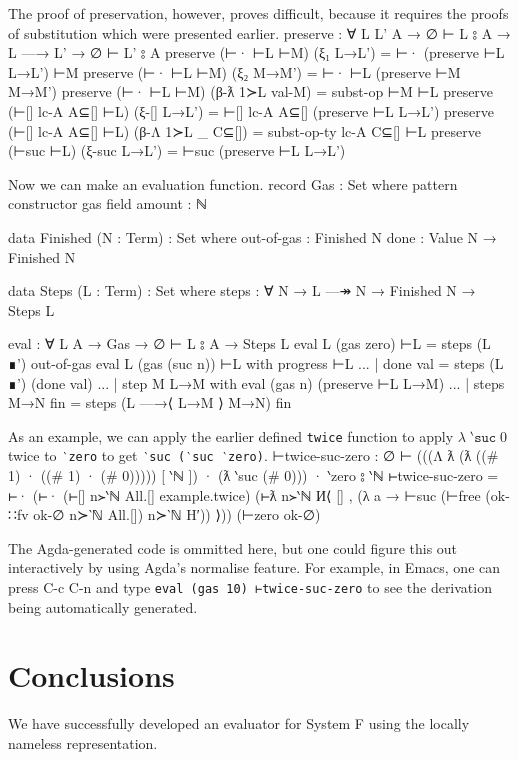 \documentclass[logo,bsc,singlespacing,parskip,online]{infthesis}
\renewenvironment{code}{\mintedcopy[breaklines,breaksymbolleft=\;]{agda}}{\endmintedcopy}
\begin{document}
The proof of preservation, however, proves difficult, because it requires the proofs of substitution
which were presented earlier.
\begin{code}
  preserve : ∀ {L L' A} → ∅ ⊢ L ⦂ A → L —→ L' → ∅ ⊢ L' ⦂ A
  preserve (⊢· ⊢L ⊢M) (ξ₁ L→L') = ⊢· (preserve ⊢L L→L') ⊢M
  preserve (⊢· ⊢L ⊢M) (ξ₂ M→M') = ⊢· ⊢L (preserve ⊢M M→M')
  preserve (⊢· ⊢L ⊢M) (β-ƛ 1≻L val-M) = subst-op ⊢M ⊢L
  preserve (⊢[] lc-A A⊆[] ⊢L) (ξ-[] L→L') =
    ⊢[] lc-A A⊆[] (preserve ⊢L L→L')
  preserve (⊢[] lc-A A⊆[] ⊢L) (β-Λ 1≻L _ C⊆[]) =
    subst-op-ty lc-A C⊆[] ⊢L
  preserve (⊢suc ⊢L) (ξ-suc L→L') = ⊢suc (preserve ⊢L L→L')
\end{code}

Now we can make an evaluation function.
\begin{code}
  record Gas : Set where
    pattern
    constructor gas
    field
      amount : ℕ

  data Finished (N : Term) : Set where
    out-of-gas : Finished N
    done : Value N → Finished N

  data Steps (L : Term) : Set where
    steps : ∀ {N} → L —↠ N → Finished N → Steps L

  eval : ∀ {L A} → Gas → ∅ ⊢ L ⦂ A → Steps L
  eval {L} (gas zero) ⊢L = steps (L ∎') out-of-gas
  eval {L} (gas (suc n)) ⊢L with progress ⊢L
  ... | done val = steps (L ∎') (done val)
  ... | step {M} L→M with eval (gas n) (preserve ⊢L L→M)
  ...   | steps M→N fin = steps (L —→⟨ L→M ⟩ M→N) fin
\end{code}

As an example, we can apply the earlier defined \texttt{twice} function to apply $\lambda \;
\texttt{‵suc} \; 0$ twice to \texttt{‵zero} to get \texttt{‵suc (‵suc ‵zero)}.
\begin{code}
  ⊢twice-suc-zero :
    ∅ ⊢ (((Λ ƛ (ƛ ((# 1) · ((# 1) · (# 0))))) [ ‵ℕ ])
          · (ƛ ‵suc (# 0))) · ‵zero
        ⦂ ‵ℕ
  ⊢twice-suc-zero = ⊢·
    (⊢· (⊢[] n≻‵ℕ All.[] example.twice)
      (⊢ƛ n≻‵ℕ И⟨ [] , (λ a →
        ⊢suc (⊢free (ok-∷fv ok-∅ n≻‵ℕ All.[]) n≻‵ℕ H′)) ⟩))
    (⊢zero ok-∅)
\end{code}

The Agda-generated code is ommitted here, but one could figure this out interactively by using
Agda's normalise feature. For example, in Emacs, one can press C-c C-n and type \texttt{eval (gas 10) ⊢twice-suc-zero} to see the derivation being automatically generated.

\chapter{Conclusions}
We have successfully developed an evaluator for System F using the locally nameless representation.
\end{document}
